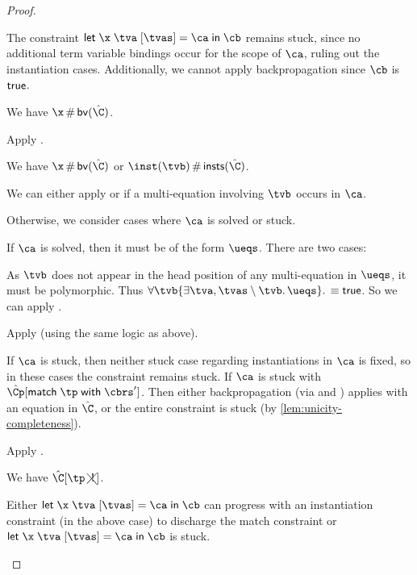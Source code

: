 \documentclass[acmsmall,screen,nonacm%
\Anonymous{,anonymous}{}%
\Final{}{,review}%
]{acmart}
\begin{document}
\begin{proof}
\begin{proofcases}
\begin{proofcases}
\begin{proofcases}

	    The constraint $\cletr \x \tv \tvs \ca \cb$ remains stuck, since
	    no additional term variable bindings occur for the scope of $\ca$,
	    ruling out the instantiation cases. Additionally, we cannot apply
	    backpropagation since $\cb$ is $\mathsf{true}$.
	\end{proofcases}

	\begin{proofcases}
	  \proofcase{$\hat\C\where{\capp \x \t}$} We have $\x \disjoint \bvs {\hat\C}$.

	  Apply .

    \proofcase{$\hat\C\where{\cpapp \x \tvb \tvc \inst}$} We have $\x \disjoint \bvs {\hat\C}$ or $\inst(\tvb) \disjoint \insts {\hat\C}$.
	    \begin{itemize}
		\proofcase{$\tvb \in \reg \tv \tvs$}

		We can either apply  or 
		if a multi-equation involving $\tvb$ occurs in $\ca$.

		Otherwise, we consider cases where $\ca$ is solved or stuck.

		If $\ca$ is solved, then it must be of the form $\ueqs$.
		There are two cases:
		\begin{itemize}
		  \proofcase{$\cexists {\tv, \tvs} \ueqs \cequiv \ctrue$}
		  As $\tvb$ does not appear in the head position of any multi-equation in $\ueqs$,
		  it must be polymorphic. Thus $\cfor \tvb {\cexists {\tv, \tvs \setminus \tvb} \ueqs} \cequiv \ctrue$.
		  So we can apply .

		  \proofcase{$\cexists {\tv, \tvs} \ueqs \cnequiv \ctrue$}
		  Apply  (using the same logic as above).

		\end{itemize}

		If $\ca$ is stuck, then neither stuck case regarding instantiations
		in $\ca$ is fixed, so in these cases the constraint remains
		stuck. If $\ca$ is stuck with $\hat\Cp\where{\cmatch \tp
    \cbrs'}$. Then either backpropagation (via  and )
		applies with an equation in $\hat\C$, or the entire constraint
    is stuck (by \cref{lem:unicity-completeness}).

		\proofcase{$\tvb \notin \reg \tv \tvs$} Apply .




	    \end{itemize}

	   We have $\nCshape {\hat\C} \tp$.

	  Either $\cletr \x \tv \tvs \ca \cb$ can progress with an instantiation constraint (in the above case) to discharge
	  the match constraint or $\cletr \x \tv \tvs \ca \cb$ is stuck.
	\end{proofcases}
    \end{proofcases}
 \end{proofcases}
\end{proof}
\end{document}
